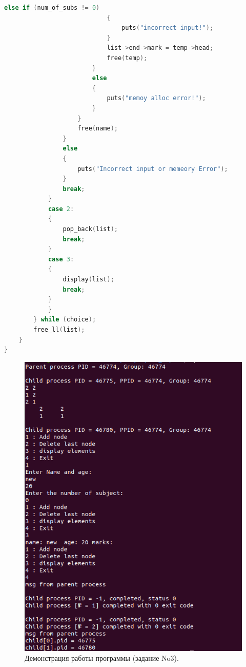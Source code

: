 \documentclass[12pt]{report}
\begin{document}
\begin{lstlisting}[label=some-code,caption=код 2-ого запушеного программа.,language=C]
                            else if (num_of_subs != 0)
                            {
                                puts("incorrect input!");
                            }
                            list->end->mark = temp->head;
                            free(temp);
                        }
                        else
                        {
                            puts("memoy alloc error!");
                        }
                    }
                    free(name);
                }
                else
                {
                    puts("Incorrect input or memeory Error");
                }
                break;
            }
            case 2:
            {
                pop_back(list);
                break;
            }
            case 3:
            {
                display(list);
                break;
            }
            }
        } while (choice);
        free_ll(list);
    }
}
\end{lstlisting}

\begin{figure}[H]

	\centering

	\includegraphics[width=\linewidth]{img/task03.png}
	\caption{Демонстрация работы программы (задание No3).}

	\label{fig:task03}

\end{figure}
\end{document}
